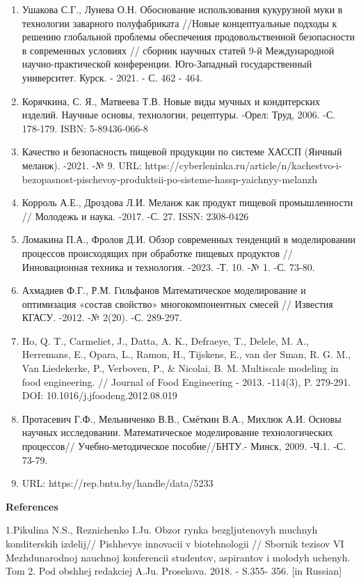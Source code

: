 \begin{enumerate}
\def\labelenumi{\arabic{enumi}.}
\setcounter{enumi}{2}
\item
  Ушакова С.Г., Лунева О.Н. Обоснование использования кукурузной муки в
  технологии заварного полуфабриката //Новые концептуальные подходы к
  решению глобальной проблемы обеспечения продовольственной безопасности
  в современных условиях // сборник научных статей 9-й Международной
  научно-практической конференции. Юго-Западный государственный
  университет. Курск. - 2021. - С. 462 - 464.
\item
  Корячкина, С. Я., Матвеева Т.В. Новые виды мучных и кондитерских
  изделий. Научные основы, технологии, рецептуры. -Орел: Труд, 2006. -С.
  178-179. ISBN: 5-89436-066-8
\item
  Качество и безопасность пищевой продукции по системе ХАССП (Яичный
  меланж). -2021. -№ 9. URL:
  https://cyberleninka.ru/article/n/kachestvo-i-bezopasnost-pischevoy-produktsii-po-sisteme-hassp-yaichnyy-melanzh
\item
  Корроль А.Е., Дроздова Л.И. Меланж как продукт пищевой промышленности
  // Молодежь и наука. -2017. -С. 27. ISSN: 2308-0426
\item
  Ломакина П.А., Фролов Д.И. Обзор современных тенденций в моделировании
  процессов происходящих при обработке пищевых продуктов //
  Инновационная техника и технология. -2023. -Т. 10. -№ 1. -С. 73-80.
\item
  Ахмадиев Ф.Г., Р.М. Гильфанов Математическое моделирование и
  оптимизация «состав свойство» многокомпонентных смесей // Известия
  КГАСУ. -2012. -№ 2(20). -С. 289-297.
\item
  Ho, Q. T., Carmeliet, J., Datta, A. K., Defraeye, T., Delele, M. A.,
  Herremans, E., Opara, L., Ramon, H., Tijskens, E., van der Sman, R. G.
  M., Van Liedekerke, P., Verboven, P., \& Nicolai, B. M. Multiscale
  modeling in food engineering. // Journal of Food Engineering - 2013.
  -114(3), P. 279-291. DOI: 10.1016/j.jfoodeng.2012.08.019
\item
  Протасевич Г.Ф., Мельниченко В.В., Смёткин В.А., Михлюк А.И. Основы
  научных исследовании. Математическое моделирование технологических
  процессов// Учебно-методическое пособие//БНТУ.- Минск, 2009. -Ч.1. -С.
  73-79.
\item
  URL: https://rep.bntu.by/handle/data/5233
\end{enumerate}

{\bfseries References}

1.Pikulina N.S., Reznichenko I.Ju. Obzor rynka bezgljutenovyh muchnyh
konditerskih izdelij// Pishhevye innovacii v biotehnologii // Sbornik
tezisov VI Mezhdunarodnoj nauchnoj konferencii studentov, aspirantov i
molodyh uchenyh. Tom 2. Pod obshhej redakciej A.Ju. Prosekova. 2018. -
S.355- 356. {[}in Russian{]}

